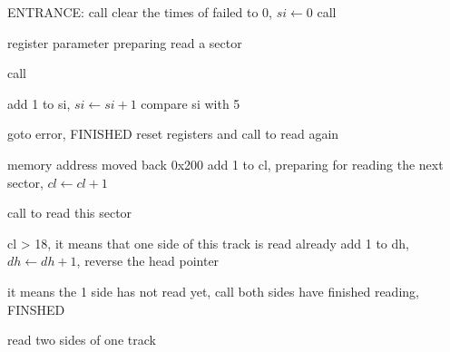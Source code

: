 \documentclass{standalone}
\begin{document}
\begin{algorithm}[H]
  \SetAlgoLined

  ENTRANCE: call \readloop{}\;
  \myproc{\readloop{}}
  {
    clear the times of failed to 0, $si \leftarrow 0$\;
    call \retry{}\;
  }

  \myproc{\retry{}}
  {
    register parameter preparing\;
    read a sector\;

    {
      call \next{}\;
    }
    {
      add 1 to si, $si \leftarrow si + 1$\;
      compare si with 5\;
      
      {
        goto error, FINISHED\;
      }
      {
        reset registers and call \retry{} to read again\;
      }
    }
  }

  \myproc{\next{}}
  {
    memory address moved back 0x200\;
    add 1 to cl, preparing for reading the next sector, $cl \leftarrow cl + 1$\;

    {
      call \readloop{} to read this sector\;
    }
    {
      cl > 18, it means that one side of this track is read already\;
      add 1 to dh, $dh \leftarrow dh + 1$, reverse the head pointer\;
    
    
      {
        it means the 1 side has not read yet, call \readloop{}\;
      }
      {
        both sides have finished reading, FINSHED\;
      }
    }
  }
  
 \caption{read two sides of one track}
\end{algorithm}
\end{document}
